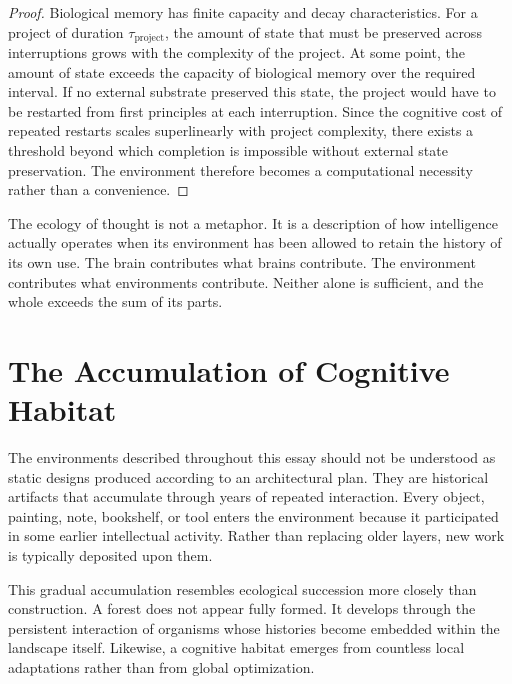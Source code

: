 \documentclass[12pt,oneside]{article}
\theoremstyle{remark}
\begin{document}
\begin{proof}
Biological memory has finite capacity and decay characteristics. For a project of duration $\tau_{\text{project}}$, the amount of state that must be preserved across interruptions grows with the complexity of the project. At some point, the amount of state exceeds the capacity of biological memory over the required interval. If no external substrate preserved this state, the project would have to be restarted from first principles at each interruption. Since the cognitive cost of repeated restarts scales superlinearly with project complexity, there exists a threshold beyond which completion is impossible without external state preservation. The environment therefore becomes a computational necessity rather than a convenience.
\end{proof}

The ecology of thought is not a metaphor. It is a description of how intelligence actually operates when its environment has been allowed to retain the history of its own use. The brain contributes what brains contribute. The environment contributes what environments contribute. Neither alone is sufficient, and the whole exceeds the sum of its parts.


\section{The Accumulation of Cognitive Habitat}

The environments described throughout this essay should not be understood as static designs produced according to an architectural plan. They are historical artifacts that accumulate through years of repeated interaction. Every object, painting, note, bookshelf, or tool enters the environment because it participated in some earlier intellectual activity. Rather than replacing older layers, new work is typically deposited upon them.

This gradual accumulation resembles ecological succession more closely than construction. A forest does not appear fully formed. It develops through the persistent interaction of organisms whose histories become embedded within the landscape itself. Likewise, a cognitive habitat emerges from countless local adaptations rather than from global optimization.
\end{document}
